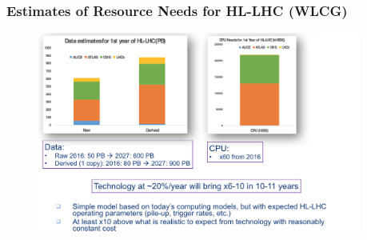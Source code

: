 \begin{frame}
\frametitle{Estimates of Resource Needs for HL-LHC (WLCG)}

\begin{figure}[htbp]
\begin{center}
\includegraphics[width=0.95\textwidth]{images/20161008-wlcg-intro-ian-bird-slide-10.png}
\end{center}
\end{figure}


\end{frame}


